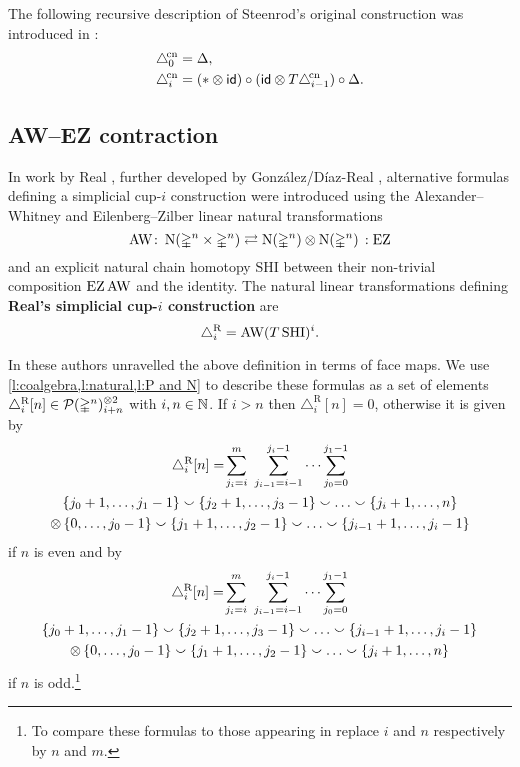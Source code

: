 \begin{remark*}
	The following recursive description of Steenrod's original construction was introduced in \cite{medina2023dennis}:
	\begin{equation}\label{e:prop cup-i}
		\begin{split}
			& \triangle^{\!\mathrm{cn}}_0 = \Delta, \\
			& \triangle^{\!\mathrm{cn}}_i =
			(\ast \otimes \mathsf{id}) \circ (\mathsf{id} \otimes T \triangle^{\!\mathrm{cn}}_{i-1}) \circ \Delta.
		\end{split}
	\end{equation}
\end{remark*}

\subsection{AW--EZ contraction}\label{ss:real}

In work by Real \cite{real1996computability}, further developed by Gonz\'alez\-/D\'iaz\--Real \cite{gonzalez-diaz1999steenrod, gonzalez2003computation, gonzalez-diaz2005cocyclic}, alternative formulas defining a simplicial \mbox{cup-$i$} construction were introduced using the Alexander--Whitney and Eilenberg--Zilber linear natural transformations
\[
\operatorname{AW} \colon \operatorname{N}(\mathbb{\Delta}^n \times \mathbb{\Delta}^n)
\rightleftarrows
\operatorname{N}(\mathbb{\Delta}^n) \otimes \operatorname{N}(\mathbb{\Delta}^n) \,: \operatorname{EZ}
\]
and an explicit natural chain homotopy $\mathrm{SHI}$ between their non-trivial composition $\operatorname{EZ} \operatorname{AW}$ and the identity.
The natural linear transformations defining \textbf{Real's simplicial \mbox{cup-$i$} construction} are
\[
\triangle^{\mathrm{R}}_i = \operatorname{AW} (T \, \mathrm{SHI})^i.
\]

In \cite[Theorem~3.1]{gonzalez-diaz1999steenrod} these authors unravelled the above definition in terms of face maps.
We use \cref{l:coalgebra,l:natural,l:P and N} to describe these formulas as a set of elements $\triangle_i^{\mathrm{R}} [n] \in \mathcal{P}(\mathbb{\Delta}^n)^{\otimes 2}_{i+n}$ with $i,n \in \mathbb{N}$.
If $i > n$ then $\triangle_i^{\mathrm{R}} [n] = 0$, otherwise it is given by
\begin{multline}\label{eq:real left}
	\triangle^{\mathrm{R}}_i [n] = \!
	\sum_{j_i=i}^{m} \ \sum_{j_{i-1}=i-1}^{j_i-1} \dots \sum_{j_0=0}^{j_1-1} \\
	\{j_0+1,\dots,j_1-1\} \union \{j_2+1,\dots,j_3-1\} \union \dots \union \{j_i+1,\dots,n\} \\ \ot \,
	\{0,\dots,j_0-1\} \union \{j_1+1,\dots,j_2-1\} \union \dots \union \{j_{i-1}+1,\dots,j_i-1\}
\end{multline}
if $n$ is even and by
\begin{multline}\label{eq:real right}
	\triangle^\rR_i [n] = \!
	\sum_{j_i=i}^{m} \ \sum_{j_{i-1}=i-1}^{j_i-1} \dots \sum_{j_0=0}^{j_1-1} \\
	\{j_0+1,\dots,j_1-1\} \union \{j_2+1,\dots,j_3-1\} \union \dots \union \{j_{i-1}+1,\dots,j_i-1\} \\ \ot \,
	\{0,\dots,j_0-1\} \union \{j_1+1,\dots,j_2-1\} \union \dots \union \{j_i+1,\dots,n\}
\end{multline}
if $n$ is odd.\footnote{To compare these formulas to those appearing in \cite[Theorem~3.1]{gonzalez-diaz1999steenrod} replace $i$ and $n$ respectively by $n$ and $m$.}

